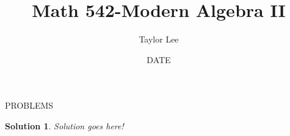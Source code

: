 \documentclass[12pt]{article}
\theoremstyle{moo}
\newtheorem*{sol}{Solution}
\begin{document}
\fontseries {\seriesdefault}
\fontshape {\shapedefault}
\selectfont

\title{ Math 542-Modern Algebra II}
\date{\usdate DATE}         
\author{Taylor Lee}                          
\maketitle                      



PROBLEMS



\begin{sol}

Solution goes here!

\end{sol}
\end{document}

